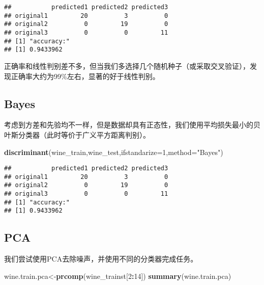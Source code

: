 \documentclass[]{article}
\newenvironment{Shaded}{\begin{snugshade}}{\end{snugshade}}
\newcommand{\DataTypeTok}[1]{\textcolor[rgb]{0.13,0.29,0.53}{#1}}
\newcommand{\DecValTok}[1]{\textcolor[rgb]{0.00,0.00,0.81}{#1}}
\newcommand{\KeywordTok}[1]{\textcolor[rgb]{0.13,0.29,0.53}{\textbf{#1}}}
\newcommand{\NormalTok}[1]{#1}
\newcommand{\OperatorTok}[1]{\textcolor[rgb]{0.81,0.36,0.00}{\textbf{#1}}}
\newcommand{\StringTok}[1]{\textcolor[rgb]{0.31,0.60,0.02}{#1}}
\begin{document}
\begin{verbatim}
##           predicted1 predicted2 predicted3
## original1         20          3          0
## original2          0         19          0
## original3          0          0         11
## [1] "accuracy:"
## [1] 0.9433962
\end{verbatim}

正确率和线性判别差不多，但当我们多选择几个随机种子（或采取交叉验证），发现正确率大约为99\%左右，显著的好于线性判别。

\hypertarget{bayes}{%
\subsection{Bayes}\label{bayes}}

考虑到方差和先验均不一样，但是数据却具有正态性，我们使用平均损失最小的贝叶斯分类器（此时等价于广义平方距离判别）。

\begin{Shaded}
\begin{Highlighting}[]
\KeywordTok{discriminant}\NormalTok{(wine_train,wine_test,}\DataTypeTok{ifstandarize=}\DecValTok{1}\NormalTok{,}\DataTypeTok{method=}\StringTok{"Bayes"}\NormalTok{)}
\end{Highlighting}
\end{Shaded}

\begin{verbatim}
##           predicted1 predicted2 predicted3
## original1         20          3          0
## original2          0         19          0
## original3          0          0         11
## [1] "accuracy:"
## [1] 0.9433962
\end{verbatim}

\hypertarget{pca}{%
\subsection{PCA}\label{pca}}

我们尝试使用PCA去除噪声，并使用不同的分类器完成任务。

\begin{Shaded}
\begin{Highlighting}[]
\NormalTok{wine.train.pca<-}\KeywordTok{prcomp}\NormalTok{(wine_trainst[}\DecValTok{2}\OperatorTok{:}\DecValTok{14}\NormalTok{])}
\KeywordTok{summary}\NormalTok{(wine.train.pca)}
\end{Highlighting}
\end{Shaded}
\end{document}

